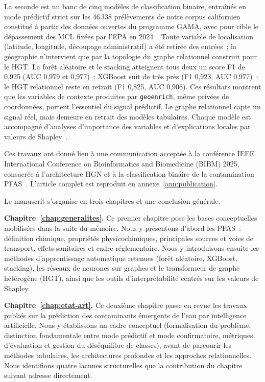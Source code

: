 La seconde est un banc de cinq mod\`eles de classification binaire, entra\^in\'es en mode pr\'edictif strict sur les 46\,338 pr\'el\`evements de notre corpus californien constitu\'e \`a partir des donn\'ees ouvertes du programme GAMA, avec pour cible le d\'epassement des MCL fix\'ees par l'EPA en 2024~\cite{epa2023npdwr}. Toute variable de localisation (latitude, longitude, d\'ecoupage administratif) a \'et\'e retir\'ee des entr\'ees~; la g\'eographie n'intervient que par la topologie du graphe relationnel construit pour le HGT. La for\^et al\'eatoire et le stacking atteignent tous deux un score F1 de 0,925 (AUC 0,979 et 0,977)~; XGBoost suit de tr\`es pr\`es (F1 0,923, AUC 0,977)~; le HGT relationnel reste en retrait (F1 0,825, AUC 0,906). Ces r\'esultats montrent que les variables de contexte produites par \texttt{geoenrich}, m\^eme priv\'ees de coordonn\'ees, portent l'essentiel du signal pr\'edictif. Le graphe relationnel capte un signal r\'eel, mais demeure en retrait des mod\`eles tabulaires. Chaque mod\`ele est accompagn\'e d'analyses d'importance des variables et d'explications locales par valeurs de Shapley~\cite{lundberg2017shap}.

Ces travaux ont donn\'e lieu \`a une communication accept\'ee \`a la conf\'erence IEEE International Conference on Bioinformatics and Biomedicine (BIBM) 2025, consacr\'ee \`a l'architecture HGN et \`a la classification bin\'aire de la contamination PFAS~\cite{bomgni2025pfas}. L'article complet est reproduit en annexe~\ref{ann:publication}.


\label{sec:intro-organisation}

Le manuscrit s'organise en trois chapitres et une conclusion g\'en\'erale.

\textbf{Chapitre~\ref{chap:generalites}.} Ce premier chapitre pose les bases conceptuelles mobilis\'ees dans la suite du m\'emoire. Nous y pr\'esentons d'abord les PFAS~: d\'efinition chimique, propri\'et\'es physicochimiques, principales sources et voies de transport, effets sanitaires et cadre r\'eglementaire. Nous y introduisons ensuite les m\'ethodes d'apprentissage automatique retenues (for\^et al\'eatoire, XGBoost, stacking), les r\'eseaux de neurones sur graphes et le transformeur de graphe h\'et\'erog\`ene (HGT), ainsi que les outils d'interpr\'etabilit\'e centr\'es sur les valeurs de Shapley.

\textbf{Chapitre~\ref{chap:etat-art}.} Ce deuxi\`eme chapitre passe en revue les travaux publi\'es sur la pr\'ediction des contaminants \'emergents de l'eau par intelligence artificielle. Nous y \'etablissons un cadre conceptuel (formalisation du probl\`eme, distinction fondamentale entre mode pr\'edictif et mode confirmatoire, m\'etriques d'\'evaluation et gestion du d\'es\'equilibre de classes), avant de parcourir les m\'ethodes tabulaires, les architectures profondes et les approches relationnelles. Nous identifions quatre lacunes structurelles que la contribution du chapitre suivant adresse directement.

